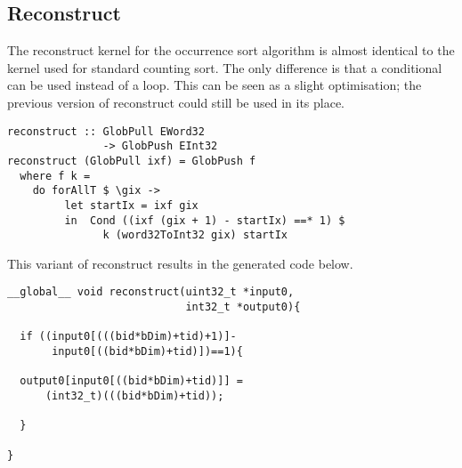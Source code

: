 \subsection{Reconstruct} 

The reconstruct kernel for the occurrence sort algorithm  is
almost identical to the kernel used for standard counting sort. The
only difference is that a conditional can be used instead of a loop. 
This can be seen as a slight optimisation; the previous version of reconstruct 
could still be used in its place. 

\begin{small}
\begin{Verbatim}[samepage=true]
reconstruct :: GlobPull EWord32 
               -> GlobPush EInt32
reconstruct (GlobPull ixf) = GlobPush f
  where f k = 
    do forAllT $ \gix ->
         let startIx = ixf gix 
         in  Cond ((ixf (gix + 1) - startIx) ==* 1) $
               k (word32ToInt32 gix) startIx
\end{Verbatim}
\end{small}

This variant of reconstruct results in the generated code below. 

\begin{small}
\begin{Verbatim}[samepage=true]
__global__ void reconstruct(uint32_t *input0,
                            int32_t *output0){
   
  if ((input0[(((bid*bDim)+tid)+1)]-
       input0[((bid*bDim)+tid)])==1){

  output0[input0[((bid*bDim)+tid)]] = 
      (int32_t)(((bid*bDim)+tid));
  
  }

}
\end{Verbatim}
\end{small}





%
%


